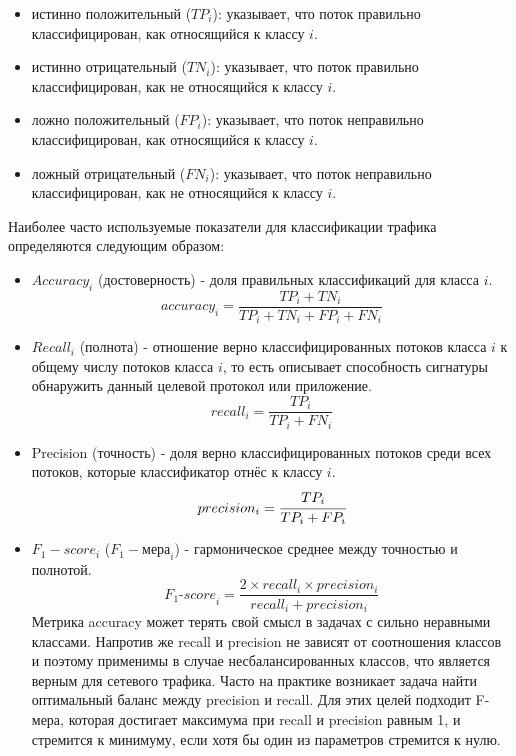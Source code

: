 \begin{itemize}
    \item истинно положительный ($TP_i$): указывает, что поток правильно классифицирован, как относящийся к классу $i$.
    \item истинно отрицательный ($TN_i$): указывает, что поток правильно классифицирован, как не относящийся к классу $i$.
    \item ложно положительный ($FP_i$): указывает, что поток неправильно классифицирован, как относящийся к классу $i$.
    \item ложный отрицательный ($FN_i$): указывает, что поток неправильно классифицирован, как не относящийся к классу $i$.
\end{itemize}

Наиболее часто используемые показатели для классификации трафика определяются следующим образом:

\begin{itemize}
    \item $Accuracy_i$ (достоверность) - доля правильных классификаций для класса $i$.
    $$ accuracy_i = \dfrac{TP_i + TN_i}{TP_i + TN_i + FP_i + FN_i} $$

    \item $Recall_i$ (полнота) - отношение верно классифицированных потоков класса $i$ к общему числу потоков класса $i$,
    то есть описывает способность сигнатуры обнаружить данный целевой протокол или приложение.
    $$ recall_i = \dfrac{TP_i}{TP_i + FN_i} $$

    \item Precision (точность) - доля верно классифицированных потоков среди всех потоков, которые классификатор отнёс к классу $i$.
    $$ precision_i = \cfrac{TP_i}{TP_i + FP_i} $$

    \item $F_1-score_i$ ($F_1-\text{мера}_i$) - гармоническое среднее между точностью и полнотой.
     $$ \textit{$F_1$-score}_i = \dfrac{2 \times recall_i \times precision_i}{recall_i + precision_i} $$
    Метрика accuracy может терять свой смысл в задачах с сильно неравными классами.
    Напротив же recall и precision не зависят от соотношения классов и поэтому применимы в случае несбалансированных классов,
    что является верным для сетевого трафика. Часто на практике возникает задача найти оптимальный баланс между precision
    и recall. Для этих целей подходит F-мера, которая достигает максимума при recall
    и precision равным 1, и стремится к минимуму, если хотя бы один из параметров стремится к нулю.

\end{itemize}

